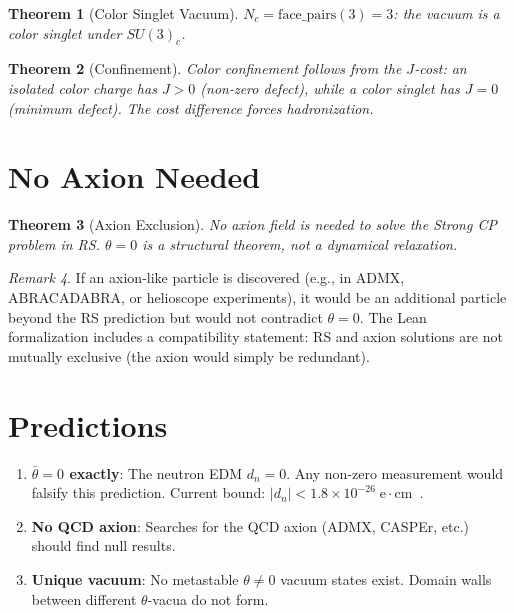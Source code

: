 \documentclass[12pt,a4paper]{article}
\newtheorem{theorem}{Theorem}[section]
\theoremstyle{definition}
\theoremstyle{remark}
\newtheorem{remark}[theorem]{Remark}
\begin{document}
\begin{theorem}[Color Singlet Vacuum]
$N_c = \mathrm{face\_pairs}(3) = 3$: the vacuum is a color singlet
under $SU(3)_c$.
\end{theorem}

\begin{theorem}[Confinement]
Color confinement follows from the $J$-cost: an isolated color
charge has $J > 0$ (non-zero defect), while a color singlet has
$J = 0$ (minimum defect).  The cost difference forces hadronization.
\end{theorem}

\section{No Axion Needed}
\label{sec:no-axion}

\begin{theorem}[Axion Exclusion]
No axion field is needed to solve the Strong CP problem in RS.
$\theta = 0$ is a structural theorem, not a dynamical relaxation.
\end{theorem}

\begin{remark}
If an axion-like particle is discovered (e.g., in ADMX,
ABRACADABRA, or helioscope experiments), it would be an additional
particle beyond the RS prediction but would not contradict
$\theta = 0$.  The Lean formalization includes a compatibility
statement: RS and axion solutions are not mutually exclusive
(the axion would simply be redundant).
\end{remark}

\section{Predictions}
\label{sec:predictions}

\begin{enumerate}
  \item \textbf{$\bar{\theta} = 0$ exactly}: The neutron EDM
  $d_n = 0$.  Any non-zero measurement would falsify this
  prediction.  Current bound:
  $|d_n| < 1.8 \times 10^{-26}\;\mathrm{e\cdot cm}$~\cite{Abel2020}.

  \item \textbf{No QCD axion}: Searches for the QCD axion (ADMX,
  CASPEr, etc.) should find null results.

  \item \textbf{Unique vacuum}: No metastable $\theta \neq 0$
  vacuum states exist.  Domain walls between different $\theta$-vacua
  do not form.
\end{enumerate}
\end{document}
